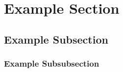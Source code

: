 \section{Example Section}

\lipsum[1]

\subsection{Example Subsection}

\lipsum[1]

\subsubsection{Example Subsubsection}

\lipsum[1]

